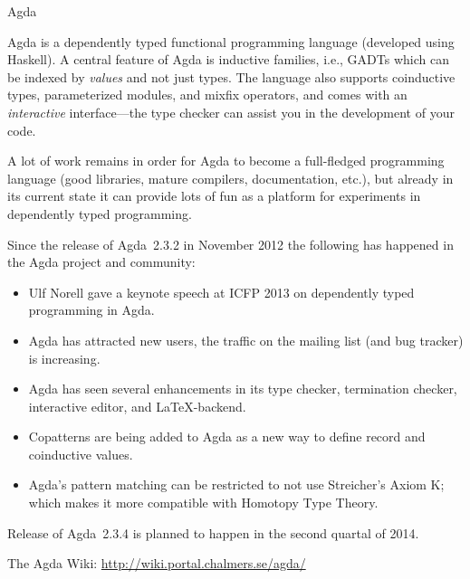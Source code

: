 \begin{hcarentry}{Agda}
\label{agda}
\makeheader

Agda is a dependently typed functional programming language (developed
using Haskell). A central feature of Agda is inductive families,
i.e., GADTs which can be indexed by \emph{values} and not just types.
The language also supports coinductive types, parameterized modules,
and mixfix operators, and comes with an \emph{interactive}
interface---the type checker can assist you in the development of your
code.

A lot of work remains in order for Agda to become a full-fledged
programming language (good libraries, mature compilers, documentation,
etc.), but already in its current state it can provide lots of fun as
a platform for experiments in dependently typed programming.

Since the release of Agda~2.3.2 in November 2012 the following has
happened in the Agda project and community:
\begin{itemize}
\item Ulf Norell gave a keynote speech at ICFP 2013 on dependently
  typed programming in Agda.
\item Agda has attracted new users, the traffic on the mailing list
  (and bug tracker) is increasing.
\item Agda has seen several
  enhancements in its type checker, termination checker, 
  interactive editor, and LaTeX-backend.
\item Copatterns are being added to Agda as a new way to define record
  and coinductive values.
\item Agda's pattern matching can be restricted to not use Streicher's
  Axiom K; which makes it more compatible with Homotopy Type Theory.
\end{itemize}
Release of Agda~2.3.4 is planned to happen in the second quartal of 2014.

\FurtherReading
  The Agda Wiki: \url{http://wiki.portal.chalmers.se/agda/}
\end{hcarentry}
